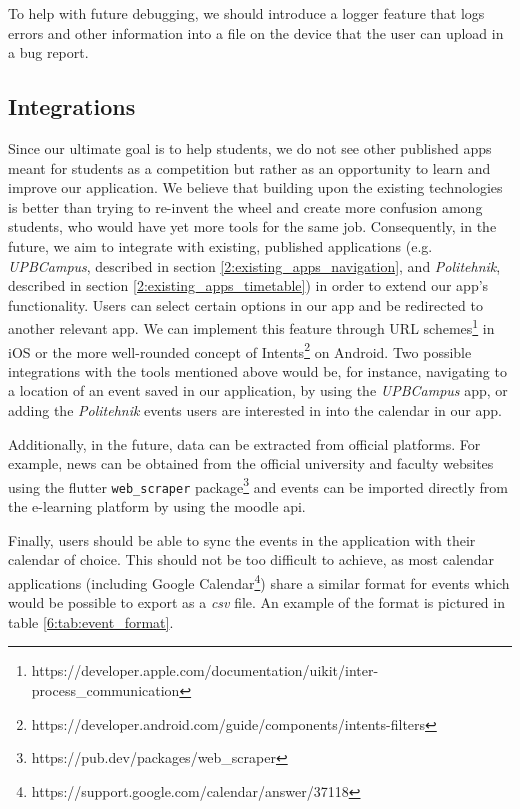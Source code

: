     To help with future debugging, we should introduce a logger feature that logs errors and other information into a file on the device that the user can upload in a bug report.
    
    \subsection{Integrations} \label{6:future_integrations}

    Since our ultimate goal is to help students, we do not see other published apps meant for students as a competition but rather as an opportunity to learn and improve our application. We believe that building upon the existing technologies is better than trying to re-invent the wheel and create more confusion among students, who would have yet more tools for the same job.  Consequently, in the future, we aim to integrate with existing, published applications (e.g. \textit{UPBCampus}, described in section \ref{2:existing_apps_navigation}, and \textit{Politehnik}, described in section \ref{2:existing_apps_timetable}) in order to extend our app's functionality. Users can select certain options in our app and be redirected to another relevant app. We can implement this feature through URL schemes\footnote{https://developer.apple.com/documentation/uikit/inter-process\_communication} in iOS or the more well-rounded concept of Intents\footnote{https://developer.android.com/guide/components/intents-filters} on Android. Two possible integrations with the tools mentioned above would be, for instance, navigating to a location of an event saved in our application, by using the \textit{UPBCampus} app, or adding the \textit{Politehnik} events users are interested in into the calendar in our app.
    
    Additionally, in the future, data can be extracted from official platforms. For example, news can be obtained from the official university and faculty websites using the \gls{flutter} \texttt{web_scraper} package\footnote{https://pub.dev/packages/web\_scraper} and events can be imported directly from the e-learning platform by using the \gls{moodle} \acrshort{api}.
    
    Finally, users should be able to sync the events in the application with their calendar of choice. This should not be too difficult to achieve, as most calendar applications (including Google Calendar\footnote{https://support.google.com/calendar/answer/37118}) share a similar format for events which would be possible to export as a \textit{csv} file. An example of the format is pictured in table \ref{6:tab:event_format}.
    

